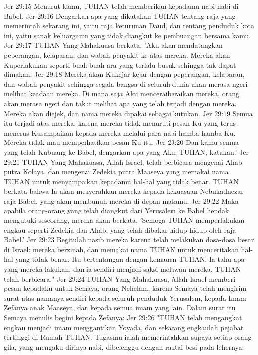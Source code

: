 Jer 29:15  Menurut kamu, TUHAN telah memberikan kepadamu nabi-nabi di Babel.
Jer 29:16  Dengarkan apa yang dikatakan TUHAN tentang raja yang memerintah sekarang ini, yaitu raja keturunan Daud, dan tentang penduduk kota ini, yaitu sanak keluargamu yang tidak diangkut ke pembuangan bersama kamu.
Jer 29:17  TUHAN Yang Mahakuasa berkata, 'Aku akan mendatangkan peperangan, kelaparan, dan wabah penyakit ke atas mereka. Mereka akan Kuperlakukan seperti buah-buah ara yang terlalu busuk sehingga tak dapat dimakan.
Jer 29:18  Mereka akan Kukejar-kejar dengan peperangan, kelaparan, dan wabah penyakit sehingga segala bangsa di seluruh dunia akan merasa ngeri melihat keadaan mereka. Di mana saja Aku menceraiberaikan mereka, orang akan merasa ngeri dan takut melihat apa yang telah terjadi dengan mereka. Mereka akan diejek, dan nama mereka dipakai sebagai kutukan.
Jer 29:19  Semua itu terjadi atas mereka, karena mereka tidak menuruti pesan-Ku yang terus-menerus Kusampaikan kepada mereka melalui para nabi hamba-hamba-Ku. Mereka tidak mau memperhatikan pesan-Ku itu.
Jer 29:20  Dan kamu semua yang telah Kubuang ke Babel, dengarkan apa yang Aku, TUHAN, katakan.'
Jer 29:21  TUHAN Yang Mahakuasa, Allah Israel, telah berbicara mengenai Ahab putra Kolaya, dan mengenai Zedekia putra Maaseya yang memakai nama TUHAN untuk menyampaikan kepadamu hal-hal yang tidak benar. TUHAN berkata bahwa Ia akan menyerahkan mereka kepada kekuasaan Nebukadnezar raja Babel, yang akan membunuh mereka di depan matamu.
Jer 29:22  Maka apabila orang-orang yang telah diangkut dari Yerusalem ke Babel hendak mengutuki seseorang, mereka akan berkata, 'Semoga TUHAN memperlakukan engkau seperti Zedekia dan Ahab, yang telah dibakar hidup-hidup oleh raja Babel.'
Jer 29:23  Begitulah nasib mereka karena telah melakukan dosa-dosa besar di Israel: mereka berzinah, dan memakai nama TUHAN untuk menceritakan hal-hal yang tidak benar. Itu bertentangan dengan kemauan TUHAN. Ia tahu apa yang mereka lakukan, dan ia sendiri menjadi saksi melawan mereka. TUHAN telah berbicara."
Jer 29:24  TUHAN Yang Mahakuasa, Allah Israel memberi pesan kepadaku untuk Semaya, orang Nehelam, karena Semaya telah mengirim surat atas namanya sendiri kepada seluruh penduduk Yerusalem, kepada Imam Zefanya anak Maaseya, dan kepada semua imam yang lain. Dalam surat itu Semaya menulis begini kepada Zefanya:
Jer 29:26  "TUHAN telah mengangkat engkau menjadi imam menggantikan Yoyada, dan sekarang engkaulah pejabat tertinggi di Rumah TUHAN. Tugasmu ialah memerintahkan supaya setiap orang gila, yang mengaku dirinya nabi, dibelenggu dengan rantai besi pada lehernya.
